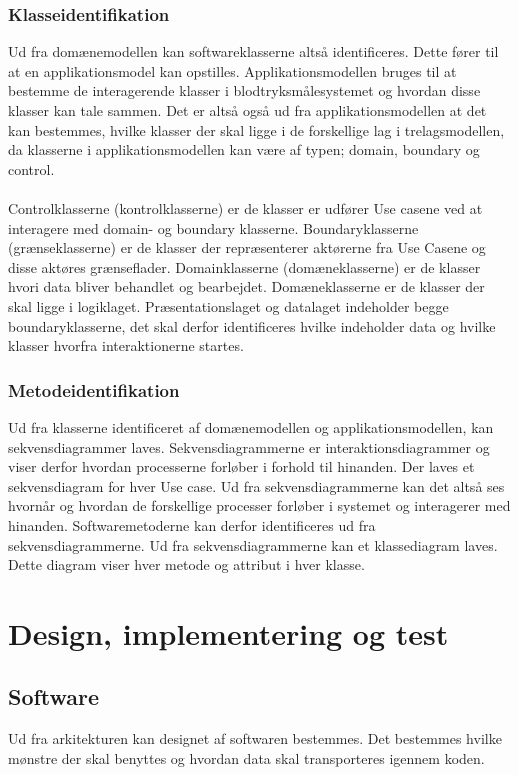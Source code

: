 \subsubsection{Klasseidentifikation}
Ud fra domænemodellen kan softwareklasserne altså identificeres. Dette fører til at en applikationsmodel kan opstilles. Applikationsmodellen bruges til at bestemme de interagerende klasser i blodtryksmålesystemet og hvordan disse klasser kan tale sammen. Det er altså også ud fra applikationsmodellen at det kan bestemmes, hvilke klasser der skal ligge i de forskellige lag i trelagsmodellen, da klasserne i applikationsmodellen kan være af typen; domain, boundary og control.\\\\ Controlklasserne (kontrolklasserne) er de klasser er udfører Use casene ved at interagere med domain- og boundary klasserne. Boundaryklasserne (grænseklasserne) er de klasser der repræsenterer aktørerne fra Use Casene og disse aktøres grænseflader. Domainklasserne (domæneklasserne) er de klasser hvori data bliver behandlet og bearbejdet. Domæneklasserne er de klasser der skal ligge i logiklaget. Præsentationslaget og datalaget indeholder begge boundaryklasserne, det skal derfor identificeres hvilke indeholder data og hvilke klasser hvorfra interaktionerne startes.
\subsubsection{Metodeidentifikation}
Ud fra klasserne identificeret af domænemodellen og applikationsmodellen, kan sekvensdiagrammer laves. Sekvensdiagrammerne er interaktionsdiagrammer og viser derfor hvordan processerne forløber i forhold til hinanden. Der laves et sekvensdiagram for hver Use case. Ud fra sekvensdiagrammerne kan det altså ses hvornår og hvordan de forskellige processer forløber i systemet og interagerer med hinanden. Softwaremetoderne kan derfor identificeres ud fra sekvensdiagrammerne. Ud fra sekvensdiagrammerne kan et klassediagram laves. Dette diagram viser hver metode og attribut i hver klasse.
\section{Design, implementering og test}
\subsection{Software}
Ud fra arkitekturen kan designet af softwaren bestemmes. Det bestemmes hvilke mønstre der skal benyttes og hvordan data skal transporteres igennem koden.

